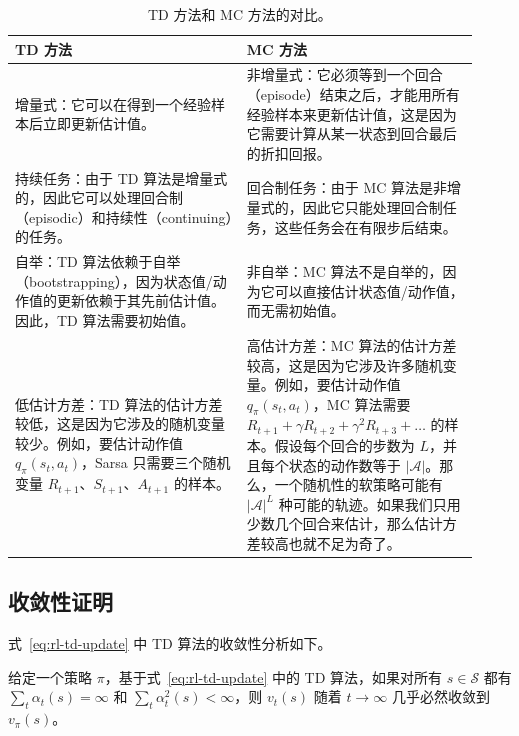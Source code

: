 \begin{table}[H]\centering
\caption{TD 方法和 MC 方法的对比。}
\label{tab:rl-td-vs-mc}
\renewcommand{\arraystretch}{1.3}
\begin{tabular}{p{0.46\linewidth} p{0.46\linewidth}}
\toprule
\textbf{TD 方法} & \textbf{MC 方法} \\
\midrule
增量式：它可以在得到一个经验样本后立即更新估计值。 & 非增量式：它必须等到一个回合（episode）结束之后，才能用所有经验样本来更新估计值，这是因为它需要计算从某一状态到回合最后的折扣回报。 \\
\addlinespace
持续任务：由于 TD 算法是增量式的，因此它可以处理回合制（episodic）和持续性（continuing）的任务。 & 回合制任务：由于 MC 算法是非增量式的，因此它只能处理回合制任务，这些任务会在有限步后结束。 \\
\addlinespace
自举：TD 算法依赖于自举（bootstrapping），因为状态值/动作值的更新依赖于其先前估计值。因此，TD 算法需要初始值。 & 非自举：MC 算法不是自举的，因为它可以直接估计状态值/动作值，而无需初始值。 \\
\addlinespace
低估计方差：TD 算法的估计方差较低，这是因为它涉及的随机变量较少。例如，要估计动作值 $q_{\pi}(s_t, a_t)$，Sarsa 只需要三个随机变量 $R_{t+1}$、$S_{t+1}$、$A_{t+1}$ 的样本。 & 高估计方差：MC 算法的估计方差较高，这是因为它涉及许多随机变量。例如，要估计动作值 $q_{\pi}(s_t, a_t)$，MC 算法需要 $R_{t+1} + \gamma R_{t+2} + \gamma^2 R_{t+3} + \ldots$ 的样本。假设每个回合的步数为 $L$，并且每个状态的动作数等于 $|\mathcal{A}|$。那么，一个随机性的软策略可能有 $|\mathcal{A}|^L$ 种可能的轨迹。如果我们只用少数几个回合来估计，那么估计方差较高也就不足为奇了。 \\
\bottomrule
\end{tabular}
\end{table}

\subsection{收敛性证明}
\label{sec:rl-td-sv-convergence}

式~\eqref{eq:rl-td-update} 中 TD 算法的收敛性分析如下。

\begin{theorem}[TD 算法的收敛性]
\label{thm:rl-td-convergence}
给定一个策略 $\pi$，基于式~\eqref{eq:rl-td-update} 中的 TD 算法，如果对所有 $s \in \mathcal{S}$ 都有 $\sum_t \alpha_t(s) = \infty$ 和 $\sum_t \alpha_t^2(s) < \infty$，则 $v_t(s)$ 随着 $t \to \infty$ 几乎必然收敛到 $v_{\pi}(s)$。
\end{theorem}

